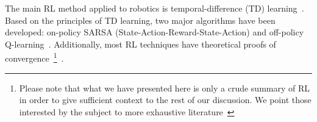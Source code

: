 






    The main RL method applied to robotics is temporal-difference (TD) learning~\parencite{Sutton1988, Bradtke1996}. Based on the principles of TD learning, two major algorithms have been developed: on-policy SARSA (State-Action-Reward-State-Action) and off-policy Q-learning~\parencite{Watkins1989}. Additionally, most RL techniques have theoretical proofs of convergence~\footnote{Please note that what we have presented here is only a crude summary of RL in order to give sufficient context to the rest of our discussion. We point those interested by the subject to more exhaustive literature~\parencite{Sutton1998, Deisenroth2011}}~\parencite{Panait2005}.


